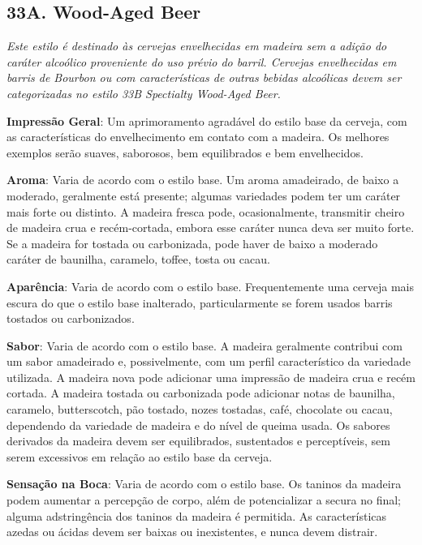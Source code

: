 \subsection*{33A. Wood-Aged Beer}
\textit{Este estilo é destinado às cervejas envelhecidas em madeira sem a adição do caráter alcoólico proveniente do uso prévio do barril. Cervejas envelhecidas em barris de Bourbon ou com características de outras bebidas alcoólicas devem ser categorizadas no estilo 33B Spectialty Wood-Aged Beer.}

\textbf{Impressão Geral}: Um aprimoramento agradável do estilo base da cerveja, com as características do envelhecimento em contato com a madeira. Os melhores exemplos serão suaves, saborosos, bem equilibrados e bem envelhecidos.

\textbf{Aroma}: Varia de acordo com o estilo base. Um aroma amadeirado, de baixo a moderado, geralmente está presente; algumas variedades podem ter um caráter mais forte ou distinto. A madeira fresca pode, ocasionalmente, transmitir cheiro de madeira crua e recém-cortada, embora esse caráter nunca deva ser muito forte. Se a madeira for tostada ou carbonizada, pode haver de baixo a moderado caráter de baunilha, caramelo, toffee, tosta ou cacau.

\textbf{Aparência}: Varia de acordo com o estilo base. Frequentemente uma cerveja mais escura do que o estilo base inalterado, particularmente se forem usados barris tostados ou carbonizados.

\textbf{Sabor}: Varia de acordo com o estilo base. A madeira geralmente contribui com um sabor amadeirado e, possivelmente, com um perfil característico da variedade utilizada. A madeira nova pode adicionar uma impressão de madeira crua e recém cortada. A madeira tostada ou carbonizada pode adicionar notas de baunilha, caramelo, butterscotch, pão tostado, nozes tostadas, café, chocolate ou cacau, dependendo da variedade de madeira e do nível de queima usada. Os sabores derivados da madeira devem ser equilibrados, sustentados e perceptíveis, sem serem excessivos em relação ao estilo base da cerveja.

\textbf{Sensação na Boca}: Varia de acordo com o estilo base. Os taninos da madeira podem aumentar a percepção de corpo, além de potencializar a secura no final; alguma adstringência dos taninos da madeira é permitida. As características azedas ou ácidas devem ser baixas ou inexistentes, e nunca devem distrair.

